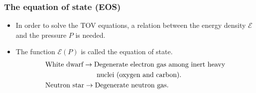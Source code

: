 \documentclass{beamer}
\begin{document}
\begin{frame}
\frametitle{The equation of state (EOS)}
\begin{itemize}
    \item In order to solve the TOV equations, a relation between the energy density $\mathcal{E}$ and the pressure $P$ is needed. 
    \item The function $\mathcal{E}(P)$ is called the equation of state.
    \begin{equation*}
        \begin{split}
            &\text{White dwarf} \to \text{Degenerate electron gas among inert heavy}\\ 
            &\hspace{2.6cm}\text{nuclei (oxygen and carbon)}. \\ 
            &\text{Neutron star} \to \text{Degenerate neutron gas}.
        \end{split}
    \end{equation*}
\end{itemize}
\end{frame}
\end{document}
